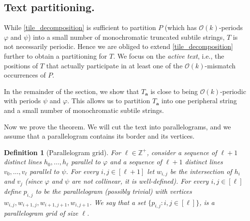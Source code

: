\documentclass[a4paper,11pt]{article}
\newtheorem{definition}{Definition}[section]
\newcommand{\Z}{\mathbb{Z}}
\renewcommand{\O}{\mathcal{O}}
\newcommand{\Ta}{T_\mathbf{a}}
\renewcommand{\phi}{\varphi}
\begin{document}
\subsection{Text partitioning.}

While \cref{tile_decomposition} is sufficient to partition $P$ (which has $\O(k)$-periods $\phi$ and $\psi$) into a small number of monochromatic truncated subtile strings, $T$ is not necessarily periodic. Hence we are obliged to extend \cref{tile_decomposition} further to obtain a partitioning for $T$. We focus on the \emph{active text}, i.e., the positions of $T$ that actually participate in at least one of the $\O(k)$-mismatch occurrences of $P$.

\restateDefActiveText%
%
\restateObsActiveText

\restateDefPeripherality

In the remainder of the section, we show that $\Ta$ is close to being $\O(k)$-periodic with periods $\psi$ and $\phi$. 
This allows us to partition $\Ta$ into one peripheral string and a small number of monochromatic subtile strings.

\restateThmTextDecomposition

Now we prove the theorem. 
We will cut the text into parallelograms, and we assume that a parallelogram contains its border and its vertices.

\begin{definition}[Parallelogram grid]
	For $\ell \in \Z^+$, consider a sequence of $\ell+1$  distinct lines $h_0, \dots, h_\ell$ parallel to $\phi$ and a sequence of $\ell+1$ distinct lines $v_0, \dots, v_\ell$ parallel to $\psi$.
	For every $i, j \in [\ell + 1]$ let $w_{i, j}$ be the intersection of $h_i$ and $v_j$ (since $\phi$ and $\psi$ are not collinear, it is well-defined).
	For every $i, j \in [\ell]$ define $p_{i, j}$ to be the parallelogram (possibly trivial) with vertices $w_{i, j}, w_{i + 1, j}, w_{i + 1, j + 1}, w_{i, j + 1}$. We say that a set $\{p_{i,j} : i,j \in [\ell]\}$, is a \emph{parallelogram grid} of size $\ell$. 
\end{definition}
\end{document}
